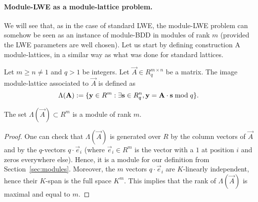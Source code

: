 \paragraph{Module-LWE as a module-lattice problem.} We will see that, as in the case of standard LWE, the module-LWE problem can somehow be seen as an instance of module-BDD in modules of rank $m$ (provided the LWE parameters are well chosen).
Let us start by defining construction A module-lattices, in a similar way as what was done for standard lattices.

\begin{definition}
Let $m \geq n \neq 1$ and $q > 1$ be integers. Let $\vec A \in R_q^{m \times n}$ be a matrix. The image module-lattice associated to $\vec A$ is defined as
\[ \Lambda(\vec A) := \{ \vec y \in R^m: \exists {\bf s} \in R_q^n, {\bf y} = {\bf A}\cdot {\bf s} \bmod q\}.\]
\end{definition}

\begin{lemma}
The set $\Lambda(\vec A) \subset R^m$ is a module of rank $m$.
\end{lemma}

\begin{proof}
One can check that $\Lambda(\vec A)$ is generated over $R$ by the column vectors of $\vec A$ and by the $q$-vectors $q \cdot \vec e_i$ (where $\vec e_i \in R^m$ is the vector with a $1$ at position $i$ and zeros everywhere else). Hence, it is a module for our definition from Section~\ref{sec:modules}.
Moreover, the $m$ vectors $q \cdot \vec e_i$ are $K$-linearly independent, hence their $K$-span is the full space $K^m$. This implies that the rank of $\Lambda(\vec A)$ is maximal and equal to $m$.
\end{proof}


